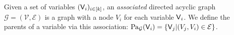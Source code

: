 \begin{definition}\label{def:mga}
Given a set of variables $(\mathsf{V}_i)_{i\in [k]}$, an \emph{associated} directed acyclic graph $\mathcal{G}=(\mathcal{V},\mathcal{E})$ is a graph with a node $V_i$ for each variable $\mathsf{V}_i$. We define the parents of a variable via this association: $\mathrm{Pa}_\mathcal{G}(\mathsf{V}_i)=\{\mathsf{V}_j|(V_j,V_i)\in \mathcal{E}\}$.
\end{definition}


